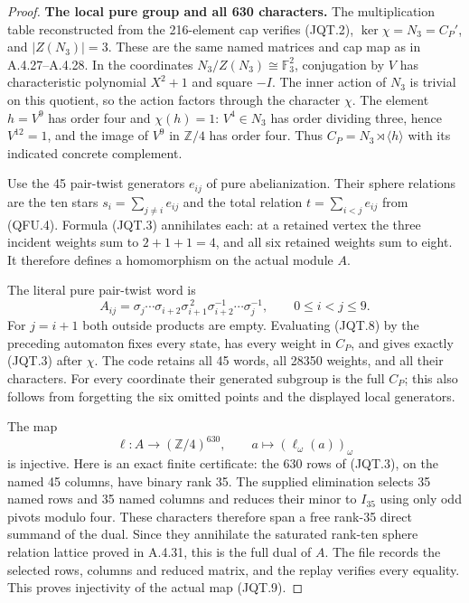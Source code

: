 \begin{proof}
\par\medskip\noindent\textbf{The local pure group and all 630 characters.}\quad
The multiplication table reconstructed from the 216-element
cap verifies (JQT.2), $\ker\chi=N_3=C_P'$, and
$|Z(N_3)|=3$.  These are the same named matrices and cap
map as in A.4.27--A.4.28.  In the coordinates
$N_3/Z(N_3)\cong\mathbb F_3^2$, conjugation by $V$ has
characteristic polynomial $X^2+1$ and square $-I$.
The inner action of $N_3$ is trivial on this quotient,
so the action factors through the character $\chi$.
The element $h=V^9$ has order four and $\chi(h)=1$:
$V^4\in N_3$ has order dividing three, hence $V^{12}=1$,
and the image of $V^9$ in $\mathbb Z/4$ has order four.
Thus $C_P=N_3\rtimes\langle h\rangle$ with its indicated
concrete complement.

Use the 45 pair-twist generators $e_{ij}$ of pure
abelianization.  Their sphere relations are the ten stars
$s_i=\sum_{j\ne i}e_{ij}$ and the total relation
$t=\sum_{i<j}e_{ij}$ from (QFU.4).  Formula (JQT.3)
annihilates each: at a retained vertex the three incident
weights sum to $2+1+1=4$, and all six retained weights
sum to eight.  It therefore defines a homomorphism on
the actual module $A$.

The literal pure pair-twist word is
\[
 A_{ij}=\sigma_j\cdots\sigma_{i+2}
             \sigma_{i+1}^{\,2}
             \sigma_{i+2}^{-1}\cdots\sigma_j^{-1},
       \qquad 0\leq i<j\leq9.                              \tag{JQT.8}
\]
For $j=i+1$ both outside products are empty.
Evaluating (JQT.8) by the preceding automaton fixes every
state, has every weight in $C_P$, and gives exactly
(JQT.3) after $\chi$.  The code retains all 45 words,
all 28350 weights, and all their characters.  For every
coordinate their generated subgroup is the full $C_P$;
this also follows from forgetting the six omitted points
and the displayed local generators.

The map
\[
 \ell:A\longrightarrow(\mathbb Z/4)^{630},
        \qquad a\longmapsto(\ell_\omega(a))_\omega
                                                               \tag{JQT.9}
\]
is injective.  Here is an exact finite certificate: the
630 rows of (JQT.3), on the named 45 columns, have binary
rank 35.  The supplied elimination selects 35 named rows
and 35 named columns and reduces their minor to $I_{35}$
using only odd pivots modulo four.  These characters
therefore span a free rank-35 direct summand of the dual.
Since they annihilate the saturated rank-ten sphere
relation lattice proved in A.4.31, this is the full dual
of $A$.  The file records the selected rows, columns and
reduced matrix, and the replay verifies every equality.
This proves injectivity of the actual map (JQT.9).


\end{proof}
